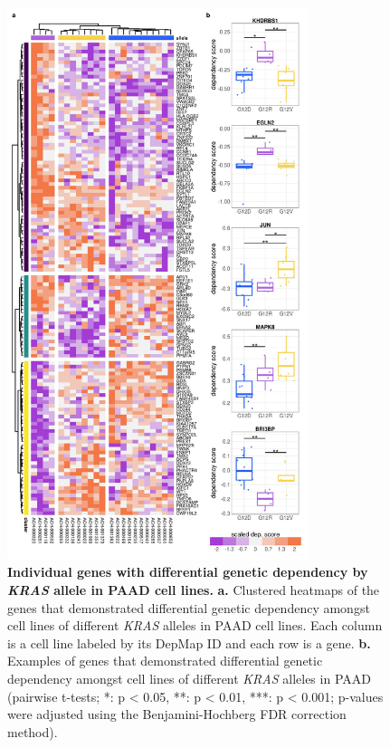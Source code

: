 \documentclass[english, 10pt, letterpaper]{article}
\newcommand{\KRAS}{\emph{KRAS}}
\begin{document}
\begin{figure}[h!]
\centering
\includegraphics[width=88mm]{figures/Supp_Fig_7.jpeg}
\caption{
    \textbf{Individual genes with differential genetic dependency by \KRAS{} allele in PAAD cell lines.}
    \textbf{a.} Clustered heatmaps of the genes that demonstrated differential genetic dependency amongst cell lines of different \KRAS{} alleles in PAAD cell lines. Each column is a cell line labeled by its DepMap ID and each row is a gene.
    \textbf{b.} Examples of genes that demonstrated differential genetic dependency amongst cell lines of different \KRAS{} alleles in PAAD (pairwise t-tests; *: p < 0.05, **: p < 0.01, ***: p < 0.001; p-values were adjusted using the Benjamini-Hochberg FDR correction method).
}
\label{sfig:paad-dependency-heatmap}
\end{figure}
\newpage




\end{document}
